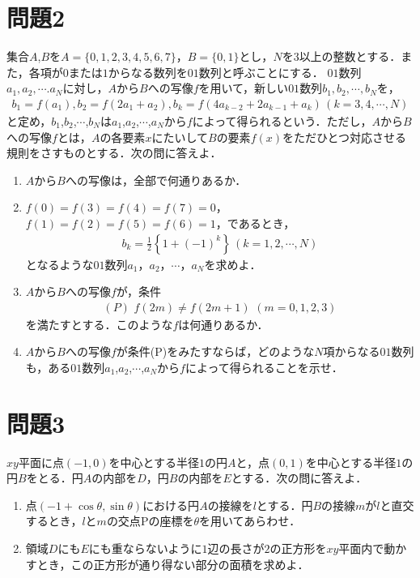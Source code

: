 \documentclass[unicode,12pt, A4j]{ltjsarticle}%
\begin{document}
\section{問題2}
集合$A$,$B$を$A=\{0,1,2,3,4,5,6,7\}$，$B=\{0,1\}$とし，$N$を$3$以上の整数とする．また，各項が$0$または$1$からなる数列を$01$数列と呼ぶことにする．
 $01$数列$a_1,a_2,\cdots.a_N$に対し，$A$から$B$への写像$f$を用いて，新しい$01$数列$b_1,b_2,\cdots,b_N$を，
\begin{align*}
 b_1=f(a_1),b_2=f(2a_1+a_2),b_k=f(4a_{k-2}+2a_{k-1}+a_k)\, (k=3,4,\cdots, N)
\end{align*}
と定め，$b_1$,$b_2$,$\cdots$,$b_N$は$a_1$,$a_2$,$\cdots$,$a_N$から$f$によって得られるという．ただし，$A$から$B$への写像$f$とは，$A$の各要素$x$にたいして$B$の要素$f(x)$をただひとつ対応させる規則をさすものとする．次の問に答えよ．
\begin{enumerate}
 \item $A$から$B$への写像は，全部で何通りあるか．
 \item $f(0)=f(3)=f(4)=f(7)=0$，$f(1)=f(2)=f(5)=f(6)=1$，であるとき，
       \begin{align*}
	b_k=\frac{1}{2}\left\{1+(-1)^k\right\}\, (k=1,2,\cdots,N)
       \end{align*}
       となるような$01$数列$a_1$，$a_2$，$\cdots$，$a_N$を求めよ．
 \item $A$から$B$への写像$f$が，条件
       \begin{align*}	
       (P)\,\, f(2m)\neq f(2m+1)\,\, (m=0,1,2,3)
       \end{align*}
       を満たすとする．このような$f$は何通りあるか．
 \item $A$から$B$への写像$f$が条件(P)をみたすならば，どのような$N$項からなる$01$数列も，ある$01$数列$a_1$,$a_2$,$\cdots$,$a_N$から$f$によって得られることを示せ．
\end{enumerate}

\section{問題3}
$xy$平面に点$(-1,0)$を中心とする半径$1$の円$A$と，点$(0,1)$を中心とする半径$1$の円$B$をとる．円$A$の内部を$D$，円$B$の内部を$E$とする．次の問に答えよ．
\begin{enumerate}
 \item 点$(-1+\cos\theta,\sin\theta)$における円$A$の接線を$l$とする．円$B$の接線$m$が$l$と直交するとき，$l$と$m$の交点$\mathrm{P}$の座標を$\theta$を用いてあらわせ．
 \item 領域$D$にも$E$にも重ならないように$1$辺の長さが$2$の正方形を$xy$平面内で動かすとき，この正方形が通り得ない部分の面積を求めよ．
\end{enumerate}
\end{document}
